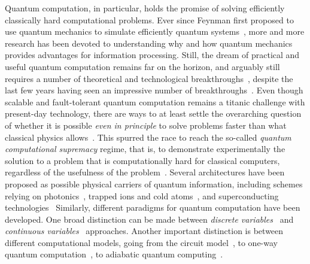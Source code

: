 Quantum computation, in particular, holds the promise of solving efficiently classically hard computational problems.
Ever since Feynman first proposed to use quantum mechanics to simulate efficiently quantum systems~\cite{feynman1982simulating}, more and more research has been devoted to understanding why and how quantum mechanics provides advantages for information processing.
Still, the dream of practical and useful quantum computation remains far on the horizon, and arguably still requires a number of theoretical and technological breakthroughs~\cite{dowling2003quantum,preskill2018quantum},
despite the last few years having seen an impressive number of breakthroughs~\cite{fowler2012surface,barends2014superconducting,córcoles2015demonstration,ofek2016extending,arute2019quantum}.
Even though scalable and fault-tolerant quantum computation remains a titanic challenge with present-day technology, there are ways to at least settle the overarching question of whether it is possible \textit{even in principle} to solve problems faster than what classical physics allows~\cite{aaronson2011computational,bremner2016average,boixo2018characterizing,aaronson2017complexity,neill2018blueprint}. This spurred the race to reach the so-called \textit{quantum computational supremacy} regime, that is, to demonstrate experimentally the solution to a problem that is computationally hard for classical computers, regardless of the usefulness of the problem~\cite{broome2012photonic,spring2012boson,crespi2013integrated,tillmann2013experimental,bentivegna2015experimental,zhong201812photon,zhong2019experimental,wang2019boson,bouland2018complexity,arute2019quantum}.
Several architectures have been proposed as possible physical carriers of quantum information, including schemes relying on photonics~\cite{flamini2018photonic,wang2019integrated}, trapped ions and cold atoms~\cite{garcía-ripoll2005quantum,lekitsch2017blueprint,bruzewicz2019trappedion}, and superconducting technologies~\cite{you2011atomic,krantz2019quantum}
Similarly, different paradigms for quantum computation have been developed. One broad distinction can be made between \textit{discrete variables}~\cite{walmsley2005applied,andersen2015hybrid} and \textit{continuous variables}~\cite{lloyd1999quantum,braunstein2005quantum} approaches.
Another important distinction is between different computational models, going from the circuit model~\cite{nielsen2006quantum}, to one-way quantum computation~\cite{raussendorf2001one,walther2005experimental,browne2006one}, to adiabatic quantum computing~\cite{aharonov2004adiabatic,albash2018adiabatic}.

